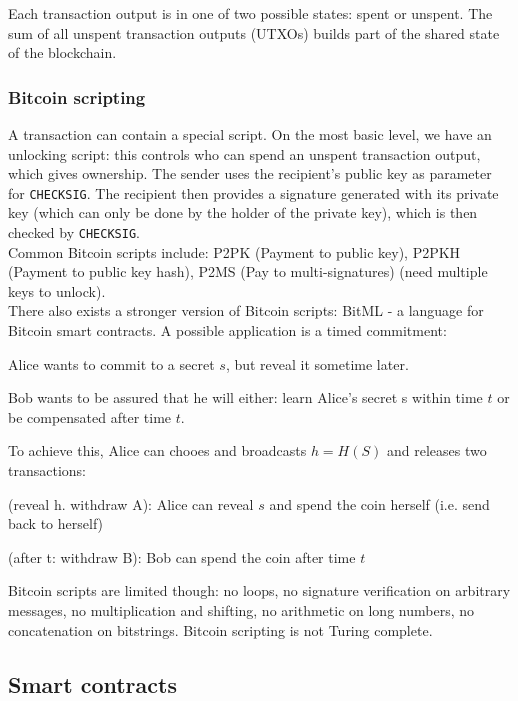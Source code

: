 \documentclass[11pt,oneside,a4paper]{article}
\begin{document}
Each transaction output is in one of two possible states: spent or unspent. The sum of all unspent transaction outputs (UTXOs) builds part of the shared state of the blockchain.

\subsubsection{Bitcoin scripting}

A transaction can contain a special script. 
On the most basic level, we have an unlocking script: this controls who can spend an unspent transaction output, which gives ownership. The sender uses the recipient's public key as parameter for \texttt{CHECKSIG}. The recipient then provides a signature generated with its private key (which can only be done by the holder of the private key), which is then checked by \texttt{CHECKSIG}.\\
Common Bitcoin scripts include: P2PK (Payment to public key), P2PKH (Payment to public key hash), P2MS (Pay to multi-signatures) (need multiple keys to unlock).\\

There also exists a stronger version of Bitcoin scripts: BitML - a language for Bitcoin smart
contracts. A possible application is a timed commitment:

\begin{compactitem}
	\item Alice wants to commit to a secret $s$, but reveal it sometime later.
	\item Bob wants to be assured that he will either: learn Alice's secret s within time $t$ or be compensated after time $t$.
	\item To achieve this, Alice can chooes and broadcasts $h = H(S)$ and releases two transactions:
	\begin{compactitem}
		\item (reveal h. withdraw A): Alice can reveal $s$ and spend the coin herself (i.e. send back to herself)
		\item (after t: withdraw B): Bob can spend the coin after time $t$
	\end{compactitem}
\end{compactitem}

Bitcoin scripts are limited though: no loops, no signature verification on arbitrary messages, no multiplication and shifting, no arithmetic on long numbers, no concatenation on bitstrings. Bitcoin scripting is not Turing complete.


\subsection{Smart contracts}
\end{document}
